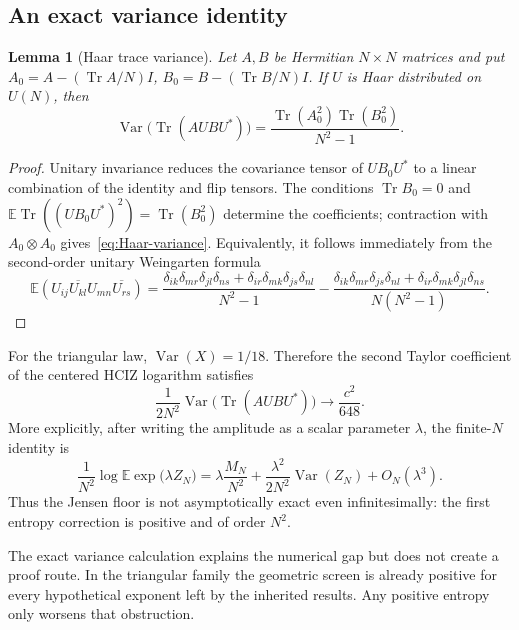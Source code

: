 \documentclass[11pt]{article}
\newcommand{\E}{\mathbb E}
\newcommand{\Var}{\operatorname{Var}}
\newcommand{\Tr}{\operatorname{Tr}}
\newcommand{\1}{\mathbf 1}
\theoremstyle{plain}
\newtheorem{lemma}[theorem]{Lemma}
\theoremstyle{definition}
\theoremstyle{remark}
\begin{document}
\subsection{An exact variance identity}

\begin{lemma}[Haar trace variance]\label{lem:Haar-variance}
Let $A,B$ be Hermitian $N\times N$ matrices and put
$A_0=A-(\Tr A/N)I$, $B_0=B-(\Tr B/N)I$.  If $U$ is Haar distributed on
$U(N)$, then
\begin{equation}\label{eq:Haar-variance}
 \Var\bigl(\Tr(AUBU^*)\bigr)
 =\frac{\Tr(A_0^2)\Tr(B_0^2)}{N^2-1}.
\end{equation}
\end{lemma}

\begin{proof}
Unitary invariance reduces the covariance tensor of
$UB_0U^*$ to a linear combination of the identity and flip tensors.  The
conditions $\Tr B_0=0$ and
$\E\Tr((UB_0U^*)^2)=\Tr(B_0^2)$ determine the coefficients; contraction with
$A_0\otimes A_0$ gives~\eqref{eq:Haar-variance}.  Equivalently, it follows
immediately from the second-order unitary Weingarten formula
\[
 \E(U_{ij}\overline{U_{kl}}U_{mn}\overline{U_{rs}})
 =\frac{\delta_{ik}\delta_{mr}\delta_{jl}\delta_{ns}
       +\delta_{ir}\delta_{mk}\delta_{js}\delta_{nl}}{N^2-1}
 -\frac{\delta_{ik}\delta_{mr}\delta_{js}\delta_{nl}
       +\delta_{ir}\delta_{mk}\delta_{jl}\delta_{ns}}{N(N^2-1)}.
\]
\end{proof}

For the triangular law, $\Var(X)=1/18$.  Therefore the second Taylor
coefficient of the centered HCIZ logarithm satisfies
\begin{equation}\label{eq:HCIZ-second-coeff}
 \frac1{2N^2}\Var\bigl(\Tr(AUBU^*)\bigr)
 \longrightarrow \frac{c^2}{648}.
\end{equation}
More explicitly, after writing the amplitude as a scalar parameter $\lambda$,
the finite-$N$ identity is
\[
 \frac1{N^2}\log\E\exp\!\bigl(\lambda Z_N\bigr)
 =\lambda\frac{M_N}{N^2}
  +\frac{\lambda^2}{2N^2}\Var(Z_N)+O_N(\lambda^3).
\]
Thus the Jensen floor is not asymptotically exact even infinitesimally: the
first entropy correction is positive and of order $N^2$.

\begin{warningbox}[Interpretation]
The exact variance calculation explains the numerical gap but does not create
a proof route.  In the triangular family the geometric screen is already
positive for every hypothetical exponent left by the inherited results.
Any positive entropy only worsens that obstruction.
\end{warningbox}
\end{document}
